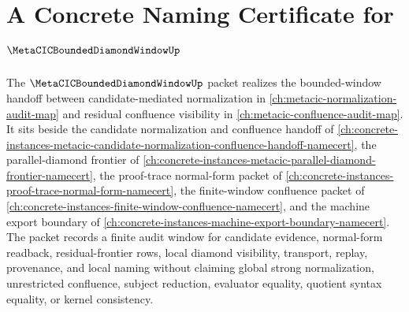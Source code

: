 \chapter{A Concrete Naming Certificate for $\MetaCICBoundedDiamondWindowUp$}
\label{ch:concrete-instances-metacic-bounded-diamond-window-namecert}

The $\MetaCICBoundedDiamondWindowUp$ packet realizes the bounded-window handoff between candidate-mediated normalization in \autoref{ch:metacic-normalization-audit-map} and residual confluence visibility in \autoref{ch:metacic-confluence-audit-map}. It sits beside the candidate normalization and confluence handoff of \autoref{ch:concrete-instances-metacic-candidate-normalization-confluence-handoff-namecert}, the parallel-diamond frontier of \autoref{ch:concrete-instances-metacic-parallel-diamond-frontier-namecert}, the proof-trace normal-form packet of \autoref{ch:concrete-instances-proof-trace-normal-form-namecert}, the finite-window confluence packet of \autoref{ch:concrete-instances-finite-window-confluence-namecert}, and the machine export boundary of \autoref{ch:concrete-instances-machine-export-boundary-namecert}. The packet records a finite audit window for candidate evidence, normal-form readback, residual-frontier rows, local diamond visibility, transport, replay, provenance, and local naming without claiming global strong normalization, unrestricted confluence, subject reduction, evaluator equality, quotient syntax equality, or kernel consistency.

